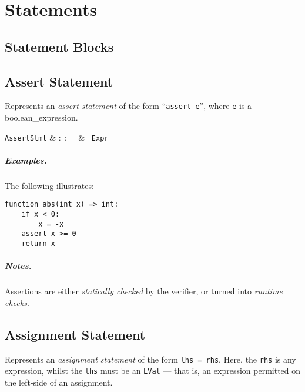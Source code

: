 \chapter{Statements}

\section{Statement Blocks}
\label{c_stmts_blocks}


\section{Assert Statement}

Represents an {\em assert statement} of the form ``\lstinline{assert e}'', where \lstinline{e} is a \gls{boolean_expression}. 

\begin{syntax}
  \verb+AssertStmt+ & $::=$ & \ \verb+Expr+\\
\end{syntax}

\paragraph{Examples.} The following illustrates:
\begin{lstlisting}
function abs(int x) => int:
    if x < 0:
        x = -x
    assert x >= 0
    return x
\end{lstlisting}

\paragraph{Notes.}  Assertions are either {\em statically checked} by the
verifier, or turned into {\em runtime checks}.



\section{Assignment Statement}

Represents an {\em assignment statement} of the form \lstinline{lhs = rhs}.  Here, the \lstinline{rhs} is any expression, whilst the \lstinline{lhs} must be an \lstinline{LVal} --- that is, an expression permitted on the left-side of an assignment.

